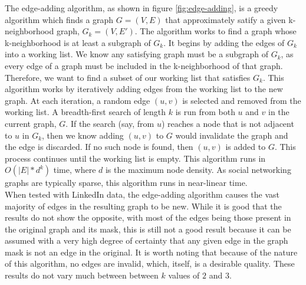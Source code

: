 \indent The edge-adding algorithm, as shown in figure \ref{fig:edge-adding}, is a greedy algorithm which finds a graph $G = (V,E)$ that approximately satify a given k-neighborhood graph, $G_k = (V, E')$. The algorithm works to find a graph whose k-neighborhood is at least a subgraph of $G_k$. It begins by adding the edges of $G_k$ into a working list. We know any satisfying graph must be a subgraph of $G_k$, as every edge of a graph must be included in the k-neighborhood of that graph. Therefore, we want to find a subset of our working list that satisfies $G_k$. This algorithm works by iteratively adding edges from the working list to the new graph.  At each iteration, a random edge $(u,v)$ is selected and removed from the working list. A breadth-first search of length $k$ is run from both $u$ and $v$ in the current graph, $G$. If the search (say, from $u$) reaches a node that is not adjacent to $u$ in $G_k$, then we know adding $(u,v)$ to $G$ would invalidate the graph and the edge is discarded. If no such node is found, then $(u,v)$ is added to $G$. This process continues until the working list is empty. This algorithm runs in $O(|E|*d^k)$ time, where $d$ is the maximum node density. As social networking graphs are typically sparse, this algorithm runs in near-linear time. \\

\indent When tested with LinkedIn data, the edge-adding algorithm causes the vast majority of edges in the resulting graph to be new. While it is good that the results do not show the opposite, with most of the edges being those present in the original graph and its mask, this is still not a good result because it can be assumed with a very high degree of certainty that any given edge in the graph mask is not an edge in the original. It is worth noting that because of the nature of this algorithm, no edges are invalid, which, itself, is a desirable quality. These results do not vary much between between $k$ values of $2$ and $3$. \\
